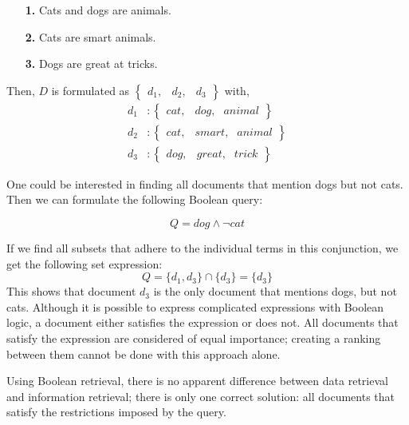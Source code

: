 \begin{itemize}
	\item[\textbf{1.}] Cats and dogs are animals.
	\item[\textbf{2.}] Cats are smart animals.
	\item[\textbf{3.}] Dogs are great at tricks. 
\end{itemize}
Then, $D$ is formulated as $\left\{
\begin{smallmatrix}
	d_1, & d_2, & d_3 
\end{smallmatrix}
\right\}$ with,
\begin{align}
	d_1&: \begin{Bmatrix}
		\mathit{cat}, & \textit{dog}, & \textit{animal}
	\end{Bmatrix}\\
	d_2&: \begin{Bmatrix}
		\mathit{cat}, & \textit{smart}, & \textit{animal}
	\end{Bmatrix}\\
	d_3&: \begin{Bmatrix}
		\mathit{dog}, & \textit{great}, & \textit{trick}
	\end{Bmatrix}
\end{align}

One could be interested in finding all documents that mention dogs but not cats. Then we can formulate the following Boolean query:

\begin{equation}
	Q = \mathit{dog} \land \neg \mathit{cat}
\end{equation}

If we find all subsets that adhere to the individual terms in this conjunction, we get the following set expression:
\begin{equation}
	Q = \{d_1, d_3\} \cap \{d_3\} = \{d_3\}
\end{equation}
This shows that document $d_3$ is the only document that mentions dogs, but not cats. Although it is possible to express complicated expressions with Boolean logic, a document either satisfies the expression or does not. All documents that satisfy the expression are considered of equal importance; creating a ranking between them cannot be done with this approach alone. 

Using Boolean retrieval, there is no apparent difference between data retrieval and information retrieval; there is only one correct solution: all documents that satisfy the restrictions imposed by the query. 

